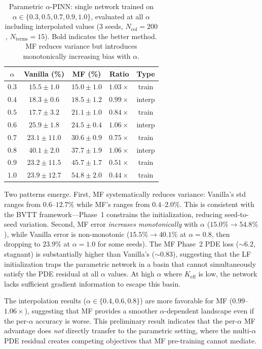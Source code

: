 \documentclass[11pt]{article}
\newcommand{\Ncol}{N_{\mathrm{col}}}
\begin{document}
\begin{table}[t]
\centering
\caption{Parametric $\alpha$-PINN: single network trained on $\alpha \in \{0.3, 0.5, 0.7, 0.9, 1.0\}$, evaluated at all $\alpha$ including interpolated values (3 seeds, $\Ncol = 200$, $N_{\mathrm{terms}} = 15$). Bold indicates the better method. MF reduces variance but introduces monotonically increasing bias with $\alpha$.}
\label{tab:parametric}
\begin{tabular}{ccccc}
\toprule
$\alpha$ & Vanilla (\%) & MF (\%) & Ratio & Type \\
\midrule
$0.3$ & $15.5 \pm 1.0$ & $\mathbf{15.0 \pm 1.0}$ & $1.03\times$ & train \\
$0.4$ & $18.3 \pm 0.6$ & $18.5 \pm 1.2$ & $0.99\times$ & interp \\
$0.5$ & $\mathbf{17.7 \pm 3.2}$ & $21.1 \pm 1.0$ & $0.84\times$ & train \\
$0.6$ & $25.9 \pm 1.8$ & $\mathbf{24.5 \pm 0.4}$ & $1.06\times$ & interp \\
$0.7$ & $\mathbf{23.1 \pm 11.0}$ & $30.6 \pm 0.9$ & $0.75\times$ & train \\
$0.8$ & $40.1 \pm 2.0$ & $\mathbf{37.7 \pm 1.9}$ & $1.06\times$ & interp \\
$0.9$ & $\mathbf{23.2 \pm 11.5}$ & $45.7 \pm 1.7$ & $0.51\times$ & train \\
$1.0$ & $\mathbf{23.9 \pm 12.7}$ & $54.8 \pm 2.0$ & $0.44\times$ & train \\
\bottomrule
\end{tabular}
\end{table}

Two patterns emerge. First, MF systematically reduces variance: Vanilla's std ranges from $0.6$--$12.7\%$ while MF's ranges from $0.4$--$2.0\%$. This is consistent with the BVTT framework---Phase~1 constrains the initialization, reducing seed-to-seed variation. Second, MF error \emph{increases monotonically} with $\alpha$ ($15.0\% \to 54.8\%$), while Vanilla error is non-monotonic ($15.5\% \to 40.1\%$ at $\alpha = 0.8$, then dropping to $23.9\%$ at $\alpha = 1.0$ for some seeds). The MF Phase~2 PDE loss (${\sim}6.2$, stagnant) is substantially higher than Vanilla's (${\sim}0.83$), suggesting that the LF initialization traps the parametric network in a basin that cannot simultaneously satisfy the PDE residual at all $\alpha$ values. At high $\alpha$ where $K_{\mathrm{eff}}$ is low, the network lacks sufficient gradient information to escape this basin.

The interpolation results ($\alpha \in \{0.4, 0.6, 0.8\}$) are more favorable for MF ($0.99$--$1.06\times$), suggesting that MF provides a smoother $\alpha$-dependent landscape even if the per-$\alpha$ accuracy is worse. This preliminary result indicates that the per-$\alpha$ MF advantage does \emph{not} directly transfer to the parametric setting, where the multi-$\alpha$ PDE residual creates competing objectives that MF pre-training cannot mediate.
\end{document}
